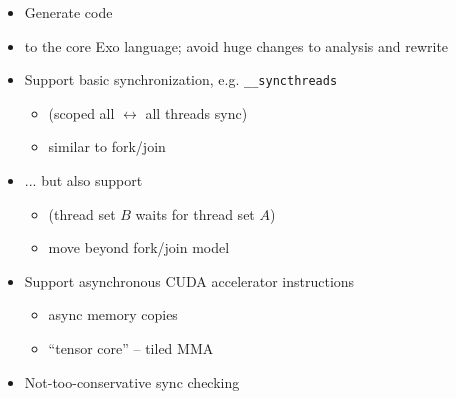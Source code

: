 \begin{minipage}[t]{0.48\textwidth}\fixminipage
\vspace{-6mm}
\vspace{6mm}
\begin{itemize}
\item Generate  code
\item {} to the core Exo language; avoid huge changes to analysis and rewrite
\item Support basic synchronization, e.g. \texttt{\_\_syncthreads}
\begin{itemize}
  \item (scoped all $\leftrightarrow$ all threads sync)
  \item similar to fork/join
\end{itemize}
\item ... but also support 
\begin{itemize}
  \item (thread set $B$ waits for thread set $A$)
  \item move beyond fork/join model
\end{itemize}
\item Support asynchronous CUDA accelerator instructions
\begin{itemize}
  \item async memory copies
  \item ``tensor core'' -- tiled MMA
\end{itemize}
\item Not-too-conservative sync checking
\end{itemize}
\end{minipage} %
\hfill
